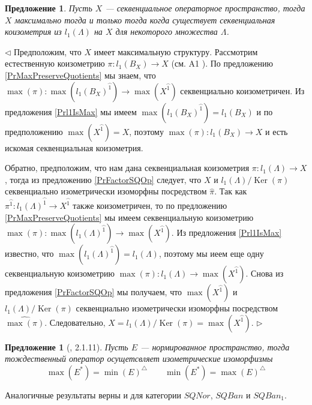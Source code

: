 \documentclass[12pt]{article}
\newtheorem{proposition}[theorem]{Предложение}
\newenvironment{proof}{\par $\triangleleft$}{$\triangleright$}
\begin{document}
\begin{proposition}\label{PrMaxIsQuotientOfl1} Пусть $X$ ---  секвенциальное операторное пространство, тогда $X$ максимально тогда и только тогда когда существует секвенциальная коизометрия из $l_1(\Lambda)$ на $X$ для некоторого множества  $\Lambda$.
\end{proposition}
\begin{proof} 
Предположим, что $X$ имеет максимальную структуру. Рассмотрим естественную коизометрию $\pi:l_1(B_X)\to X$ (см. A1 \cite{DefFloTensNorOpId}). По предложению \ref{PrMaxPreserveQuotients} мы знаем, что $\max(\pi):\max(l_1(B_X)^{\wideparen{1}})\to\max(X^{\wideparen{1}})$ секвенциально коизометричен. Из предложения \ref{Prl1IsMax} мы имеем $\max(l_1(B_X)^{\wideparen{1}})=l_1(B_X)$ и по предположению $\max(X^{\wideparen{1}})=X$, поэтому $\max(\pi):l_1(B_X)\to X$ и есть искомая секвенциальная коизометрия.

Обратно, предположим, что нам дана секвенциальная коизометрия $\pi:l_1(\Lambda)\to X$, тогда из предложению \ref{PrFactorSQOp} следует, что $X$ и $l_1(\Lambda)/\operatorname{Ker}(\pi)$ секвенциально изометрически изоморфны посредством $\widehat{\pi}$. Так как $\pi^{\wideparen{1}}:l_1(\Lambda)^{\wideparen{1}}\to X^{\wideparen{1}}$ также коизометричен, то по предложению \ref{PrMaxPreserveQuotients} мы имеем секвенциальную коизометрию $\max(\pi):\max(l_1(\Lambda)^{\wideparen{1}})\to \max(X^{\wideparen{1}})$. Из предложения \ref{Prl1IsMax} известно, что $\max(l_1(\Lambda)^{\wideparen{1}})=l_1(\Lambda)$, поэтому мы иеем еще одну секвенциальную коизометрию $\max(\pi):l_1(\Lambda)\to\max(X^{\wideparen{1}})$. Снова из предложения \ref{PrFactorSQOp} мы получаем, что  $\max(X^{\wideparen{1}})$ и $l_1(\Lambda)/\operatorname{Ker}(\pi)$ секвенциально изометрически изоморфны посредством $\widehat{\max(\pi)}$. Следовательно, $X=l_1(\Lambda)/\operatorname{Ker}(\pi)=\max(X^{\wideparen{1}})$.
\end{proof}

\begin{proposition}[\cite{LamOpFolgen}, 2.1.11]\label{PrDualityAndMinMax}
Пусть $E$ --- нормированное пространство, тогда тождественный оператор осущетсвляет изометрические изоморфизмы
$$
\max(E^*)=\min(E)^\triangle
\qquad
\min(E^*)=\max(E)^\triangle
$$
\end{proposition}

Аналогичные результаты верны и для категории $SQNor$, $SQBan$ и $SQBan_1$.
\end{document}

